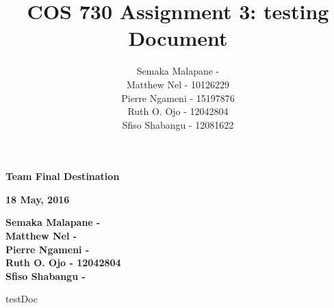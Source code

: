 \documentclass[a4paper]{article}
\title{COS 730 Assignment 3: testing Document}
\author{Semaka Malapane -  \\
		Matthew Nel -  10126229\\
		Pierre Ngameni - 15197876 \\
		Ruth O. Ojo - 12042804 \\
		Sfiso Shabangu - 12081622 }
\begin{document}
	


\begin{titlepage}
    \begin{center}
        \vspace*{1.5cm}        
        \Huge
        \textbf{Team Final Destination}

        \vspace{1.5cm}        
        \large
        \textbf{18 May, 2016}
        
        \vspace{1.0cm}
        
		\large       
	        \textbf{Semaka Malapane -  }\\
			\textbf{Matthew Nel - } \\
			\textbf{Pierre Ngameni -  }\\
			\textbf{Ruth O. Ojo - 12042804 }\\
			\textbf{Sfiso Shabangu - }        
        
        
    \end{center}
\end{titlepage}


\pagebreak
\tableofcontents
\pagebreak

{testDoc}



\end{document}
